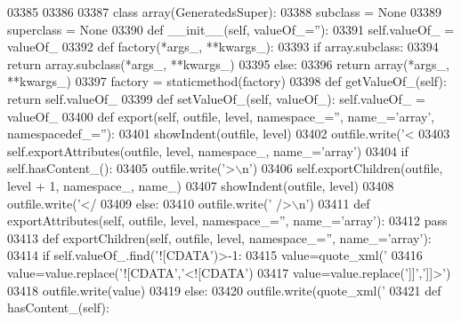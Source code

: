 \begin{DoxyCode}
{{{{{{{{{{{{{{{{{{{{{{{{{{{{{{{{{{{{{{{{{{{{{{{{{{{{{{{{{{{{{{{{{{{{{{{{{{{{{{{{{{{{{{{{{{{{{{{{{{{{{{{{{{{{{{{{{{{{{{{{{{{{{{{{{{{{{{{{{{{{{{{{{{{{{{{{{{{{{{{{{{{{{{{{{{{{{{{{{{{{{{{{{{{{{{{{{{{{{{{{{{{{{{{{{{{{{{{{{{{{{{{03385 
03386 
03387 \textcolor{keyword}{class }array(GeneratedsSuper):
03388     subclass = \textcolor{keywordtype}{None}
03389     superclass = \textcolor{keywordtype}{None}
03390     \textcolor{keyword}{def }__init__(self, valueOf\_=''):
03391         self.valueOf_ = valueOf\_
03392     \textcolor{keyword}{def }factory(*args\_, **kwargs\_):
03393         \textcolor{keywordflow}{if} array.subclass:
03394             \textcolor{keywordflow}{return} array.subclass(*args\_, **kwargs\_)
03395         \textcolor{keywordflow}{else}:
03396             \textcolor{keywordflow}{return} array(*args\_, **kwargs\_)
03397     factory = staticmethod(factory)
03398     \textcolor{keyword}{def }getValueOf_(self): \textcolor{keywordflow}{return} self.valueOf\_
03399     \textcolor{keyword}{def }setValueOf_(self, valueOf\_): self.valueOf\_ = valueOf\_
03400     \textcolor{keyword}{def }export(self, outfile, level, namespace\_='', name\_='array', namespacedef\_=''):
03401         showIndent(outfile, level)
03402         outfile.write(\textcolor{stringliteral}{'<%
03403         self.exportAttributes(outfile, level, namespace\_, name\_=\textcolor{stringliteral}{'array'})
03404         \textcolor{keywordflow}{if} self.hasContent_():
03405             outfile.write(\textcolor{stringliteral}{'>\(\backslash\)n'})
03406             self.exportChildren(outfile, level + 1, namespace\_, name\_)
03407             showIndent(outfile, level)
03408             outfile.write(\textcolor{stringliteral}{'</%
03409         \textcolor{keywordflow}{else}:
03410             outfile.write(\textcolor{stringliteral}{' />\(\backslash\)n'})
03411     \textcolor{keyword}{def }exportAttributes(self, outfile, level, namespace\_='', name\_='array'):
03412         \textcolor{keywordflow}{pass}
03413     \textcolor{keyword}{def }exportChildren(self, outfile, level, namespace\_='', name\_='array'):
03414         \textcolor{keywordflow}{if} self.valueOf\_.find(\textcolor{stringliteral}{'![CDATA'})>-1:
03415             value=quote_xml(\textcolor{stringliteral}{'%
03416             value=value.replace(\textcolor{stringliteral}{'![CDATA'},\textcolor{stringliteral}{'<![CDATA'})
03417             value=value.replace(\textcolor{stringliteral}{']]'},\textcolor{stringliteral}{']]>'})
03418             outfile.write(value)
03419         \textcolor{keywordflow}{else}:
03420             outfile.write(quote_xml(\textcolor{stringliteral}{'%
03421     \textcolor{keyword}{def }hasContent_(self):
}}}}}}}}}}}}}}}}}}}}}}}}}}}}}}}}}}}}}}}}}}}}}}}}}}}}}}}}}}}}}}}}}}}}}}}}}}}}}}}}}}}}}}}}}}}}}}}}}}}}}}}}}}}}}}}}}}}}}}}}}}}}}}}}}}}}}}}}}}}}}}}}}}}}}}}}}}}}}}}}}}}}}}}}}}}}}}}}}}}}}}}}}}}}}}}}}}}}}}}}}}}}}}}}}}}}}}}}}}}}}}}}}}}
\end{DoxyCode}
